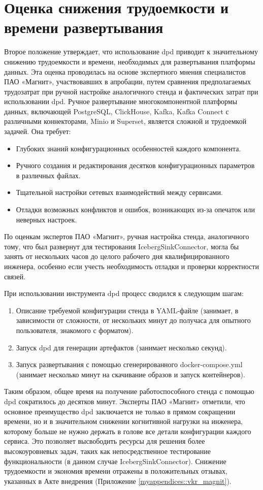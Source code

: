 \section{Оценка снижения трудоемкости и времени развертывания}
Второе положение утверждает, что использование dpd приводит к значительному снижению трудоемкости и времени, необходимых для развертывания платформы данных. Эта оценка проводилась на основе экспертного мнения специалистов ПАО «Магнит», участвовавших в апробации, путем сравнения предполагаемых трудозатрат при ручной настройке аналогичного стенда и фактических затрат при использовании dpd.
Ручное развертывание многокомпонентной платформы данных, включающей PostgreSQL, ClickHouse, Kafka, Kafka Connect с различными коннекторами, Minio и Superset, является сложной и трудоемкой задачей. Она требует:
\begin{itemize}
\item Глубоких знаний конфигурационных особенностей каждого компонента.
\item Ручного создания и редактирования десятков конфигурационных параметров в различных файлах.
\item Тщательной настройки сетевых взаимодействий между сервисами.
\item Отладки возможных конфликтов и ошибок, возникающих из-за опечаток или неверных настроек.
\end{itemize}
По оценкам экспертов ПАО «Магнит», ручная настройка стенда, аналогичного тому, что был развернут для тестирования IcebergSinkConnector, могла бы занять от нескольких часов до целого рабочего дня квалифицированного инженера, особенно если учесть необходимость отладки и проверки корректности связей.

При использовании инструмента dpd процесс сводился к следующим шагам:
\begin{enumerate}[1.]
\item Описание требуемой конфигурации стенда в YAML-файле (занимает, в зависимости от сложности, от нескольких минут до получаса для опытного пользователя, знакомого с форматом).
\item Запуск dpd для генерации артефактов (занимает несколько секунд).
\item Запуск развертывания с помощью сгенерированного docker-compose.yml (занимает несколько минут на скачивание образов и запуск контейнеров).
\end{enumerate}
Таким образом, общее время на получение работоспособного стенда с помощью dpd сократилось до десятков минут. Эксперты ПАО «Магнит» отметили, что основное преимущество dpd заключается не только в прямом сокращении времени, но и в значительном снижении когнитивной нагрузки на инженера, которому больше не нужно держать в голове все детали конфигурации каждого сервиса. Это позволяет высвободить ресурсы для решения более высокоуровневых задач, таких как непосредственное тестирование функциональности (в данном случае IcebergSinkConnector). Снижение трудоемкости и экономия времени отражены в положительных отзывах, указанных в Акте внедрения (Приложение \ref{myappendices::vkr_magnit}).

